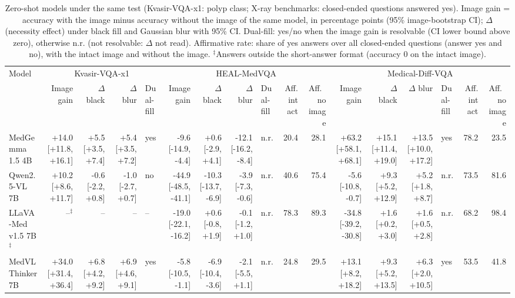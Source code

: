 \begin{table}[t]
\centering
\scriptsize
\setlength{\tabcolsep}{2.5pt}
\caption{Zero-shot models under the same test (Kvasir-VQA-x1: polyp class; X-ray benchmarks: closed-ended questions answered yes). Image gain = accuracy with the image minus accuracy without the image of the same model, in percentage points (95\% image-bootstrap CI); $\Delta$ (necessity effect) under black fill and Gaussian blur with 95\% CI. Dual-fill: yes/no when the image gain is resolvable (CI lower bound above zero), otherwise n.r. (not resolvable: $\Delta$ not read). Affirmative rate: share of yes answers over all closed-ended questions (answer yes and no), with the intact image and without the image. $^{\ddagger}$Answers outside the short-answer format (accuracy 0 on the intact image).}
\label{tab:zeroshot}
\begin{tabular}{lrrrlrrrlrrrrrlrr}
\toprule
Model & \multicolumn{4}{c}{Kvasir-VQA-x1} & \multicolumn{6}{c}{HEAL-MedVQA} & \multicolumn{6}{c}{Medical-Diff-VQA} \\
 & Image gain & $\Delta$ black & $\Delta$ blur & Dual-fill & Image gain & $\Delta$ black & $\Delta$ blur & Dual-fill & Aff.\ intact & Aff.\ no image & Image gain & $\Delta$ black & $\Delta$ blur & Dual-fill & Aff.\ intact & Aff.\ no image \\
\midrule
MedGemma 1.5 4B & +14.0 [+11.8, +16.1] & +5.5 [+3.5, +7.4] & +5.4 [+3.5, +7.2] & yes & -9.6 [-14.9, -4.4] & +0.6 [-2.9, +4.1] & -12.1 [-16.2, -8.4] & n.r. & 20.4 & 28.1 & +63.2 [+58.1, +68.1] & +15.1 [+11.4, +19.0] & +13.5 [+10.0, +17.2] & yes & 78.2 & 23.5 \\
Qwen2.5-VL 7B & +10.2 [+8.6, +11.7] & -0.6 [-2.2, +0.8] & -1.0 [-2.7, +0.7] & no & -44.9 [-48.5, -41.1] & -10.3 [-13.7, -6.9] & -3.9 [-7.3, -0.6] & n.r. & 40.6 & 75.4 & -5.6 [-10.8, -0.7] & +9.3 [+5.2, +12.9] & +5.2 [+1.8, +8.7] & n.r. & 73.5 & 81.6 \\
LLaVA-Med v1.5 7B$^{\ddagger}$ & --$^{\ddagger}$ & -- & -- & -- & -19.0 [-22.1, -16.2] & +0.6 [-0.8, +1.9] & -0.1 [-1.2, +1.0] & n.r. & 78.3 & 89.3 & -34.8 [-39.2, -30.8] & +1.6 [+0.2, +3.0] & +1.6 [+0.5, +2.8] & n.r. & 68.2 & 98.4 \\
MedVLThinker 7B & +34.0 [+31.4, +36.4] & +6.8 [+4.2, +9.2] & +6.9 [+4.6, +9.1] & yes & -5.8 [-10.5, -1.1] & -6.9 [-10.4, -3.6] & -2.1 [-5.5, +1.1] & n.r. & 24.8 & 29.5 & +13.1 [+8.2, +18.2] & +9.3 [+5.2, +13.5] & +6.3 [+2.0, +10.5] & yes & 53.5 & 41.8 \\
\bottomrule
\end{tabular}
\end{table}
